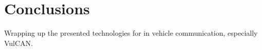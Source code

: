 
\section{Conclusions}

Wrapping up the presented technologies for in vehicle
communication, especially VulCAN.
